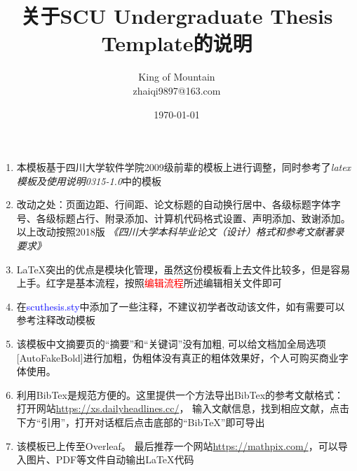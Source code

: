 \documentclass{article}
\title{\heiti 关于SCU Undergraduate Thesis Template的说明}
\author{\textrm {King of Mountain}\\[0.2em]{zhaiqi9897@163.com}}
\date{\today}
\begin{document}
 
	\maketitle  
	
	\begin{enumerate}
		\item 
		本模板基于四川大学软件学院2009级前辈的模板上进行调整，同时参考了\textit{latex模板及使用说明0315-1.0}中的模板
		\item
		改动之处：页面边距、行间距、论文标题的自动换行居中、各级标题字体字号、各级标题占行、附录添加、计算机代码格式设置、声明添加、致谢添加。以上改动按照2018版
		\textit{《四川大学本科毕业论文（设计）格式和参考文献著录要求》}
		\item 
		\LaTeX 突出的优点是模块化管理，虽然这份模板看上去文件比较多，但是容易上手。红字是基本流程，按照\textcolor{red}{编辑流程}所述编辑相关文件即可
		\item
		在\textcolor{blue}{scuthesis.sty}中添加了一些注释，不建议初学者改动该文件，如有需要可以参考注释改动模板
		\item 
		该模板中文摘要页的“摘要”和“关键词”没有加粗,
		可以给文档加全局选项[AutoFakeBold]进行加粗，伪粗体没有真正的粗体效果好，个人可购买商业字体使用。
		\item
		利用BibTex是规范方便的。这里提供一个方法导出BibTex的参考文献格式：打开网站\textcolor{green}{\url{https://xs.dailyheadlines.cc/}}，
		输入文献信息，找到相应文献，点击下方“引用”，打开对话框后点击底部的“BibTeX”即可导出
		\item
		该模板已上传至Overleaf。
		最后推荐一个网站\textcolor{green}{\url{https://mathpix.com/}}，可以导入图片、PDF等文件自动输出\LaTeX 代码
		
	\end{enumerate}
\end{document}
